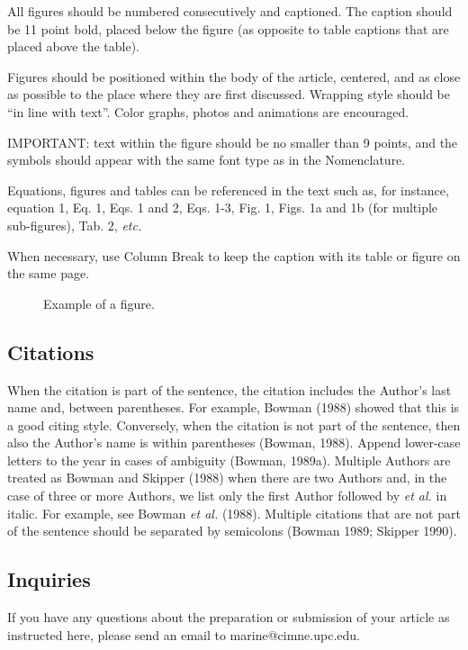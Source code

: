 \documentclass[A4paper,11pt]{marine_2023_Paper}
\begin{document}
 All figures should be numbered consecutively and captioned. The caption should be 11 point bold, placed below the figure (as opposite to table captions that are placed above the table).

 Figures should be positioned within the body of the article, centered, and as close as possible to the place where they are first discussed. Wrapping style should be ``in line with text''. Color graphs, photos and animations are encouraged.

 IMPORTANT: text within the figure should be no smaller than 9 points, and the symbols should appear with the same font type as in the Nomenclature.

 Equations, figures and tables can be referenced in the text such as, for instance, equation 1, Eq. 1, Eqs. 1 and 2, Eqs. 1-3, Fig. 1, Figs. 1a and 1b (for multiple sub-figures), Tab. 2, \textit{etc. }

 When necessary, use Column Break to keep the caption with its table or figure on the same page.

\begin{figure}[t]
\centering
\caption{Example of a figure.}
\label{fig1}
\end{figure}

\subsection{Citations}

 When the citation is part of the sentence, the citation includes the Author's last name and, between parentheses. For example, Bowman (1988) showed that this is a good citing style. Conversely, when the citation is not part of the sentence, then also the Author's name is within parentheses  (Bowman, 1988). Append lower-case letters to the year in cases of ambiguity (Bowman, 1989a). Multiple Authors are treated as Bowman and Skipper (1988) when there are two Authors and, in the case of three or more Authors, we list only the first Author followed by \textit{et al. }in italic. For example, see Bowman \textit{et al.} (1988). Multiple citations that are not part of the sentence should be separated by semicolons  (Bowman 1989; Skipper 1990).

\subsection{Inquiries}

 If you have any questions about the preparation or submission of your article as instructed here, please send an email to marine@cimne.upc.edu.
\end{document}
